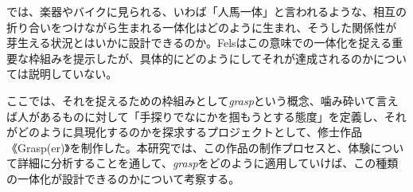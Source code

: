 では、楽器やバイクに見られる、いわば「人馬一体」と言われるような、相互の折り合いをつけながら生まれる一体化はどのように生まれ、そうした関係性が芽生える状況とはいかに設計できるのか。Felsはこの意味での一体化を捉える重要な枠組みを提示したが、具体的にどのようにしてそれが達成されるのかについては説明していない。

ここでは、それを捉えるための枠組みとして\textit{grasp}という概念、噛み砕いて言えば人があるものに対して「手探りでなにかを掴もうとする態度」を定義し、それがどのように具現化するのかを探求するプロジェクトとして、修士作品《Grasp(er)》を制作した。本研究では、この作品の制作プロセスと、体験について詳細に分析することを通して、\textit{grasp}をどのように適用していけば、この種類の一体化が設計できるのかについて考察する。




